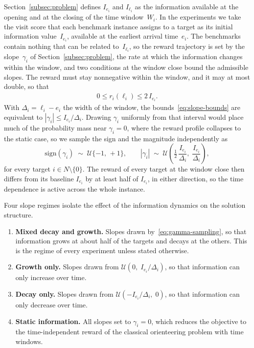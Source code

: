 \documentclass[11pt]{article}
\begin{document}
Section~\ref{subsec:problem} defines $I_{e_i}$ and $I_{\ell_i}$ as the information available at the opening and at the closing of the time window~$W_i$. In the experiments we take the visit score that each benchmark instance assigns to a target as its initial information value~$I_{e_i}$, available at the earliest arrival time~$e_i$. The benchmarks contain nothing that can be related to~$I_{\ell_i}$, so the reward trajectory is set by the slope~$\gamma_i$ of Section~\ref{subsec:problem}, the rate at which the information changes within the window, and two conditions at the window close bound the admissible slopes. The reward must stay nonnegative within the window, and it may at most double, so that
\begin{align}
    0 \leq r_i(\ell_i) \leq 2\,I_{e_i}. \label{eq:slope-bounds}
\end{align}
With $\Delta_i = \ell_i - e_i$ the width of the window, the bounds~\eqref{eq:slope-bounds} are equivalent to $|\gamma_i| \le I_{e_i}/\Delta_i$. Drawing $\gamma_i$ uniformly from that interval would place much of the probability mass near $\gamma_i = 0$, where the reward profile collapses to the static case, so we sample the sign and the magnitude independently as
\begin{equation}\label{eq:gamma-sampling}
\mathrm{sign}(\gamma_i) \;\sim\; \mathcal{U}\{-1,\, +1\},
\qquad
|\gamma_i| \;\sim\; \mathcal{U}\!\left( \tfrac{1}{2}\,\frac{I_{e_i}}{\Delta_i},\; \frac{I_{e_i}}{\Delta_i} \right),
\end{equation}
for every target $i \in N \setminus \{0\}$. The reward of every target at the window close then differs from its baseline $I_{e_i}$ by at least half of $I_{e_i}$, in either direction, so the time dependence is active across the whole instance.

Four slope regimes isolate the effect of the information dynamics on the solution structure.
\begin{enumerate}
    \item \textbf{Mixed decay and growth.} Slopes drawn by~\eqref{eq:gamma-sampling}, so that information grows at about half of the targets and decays at the others. This is the regime of every experiment unless stated otherwise.
    \item \textbf{Growth only.} Slopes drawn from $\mathcal{U}(0,\; I_{e_i}/\Delta_i)$, so that information can only increase over time.
    \item \textbf{Decay only.} Slopes drawn from $\mathcal{U}(-I_{e_i}/\Delta_i,\; 0)$, so that information can only decrease over time.
    \item \textbf{Static information.} All slopes set to $\gamma_i = 0$, which reduces the objective to the time-independent reward of the classical orienteering problem with time windows.
\end{enumerate}
\end{document}
